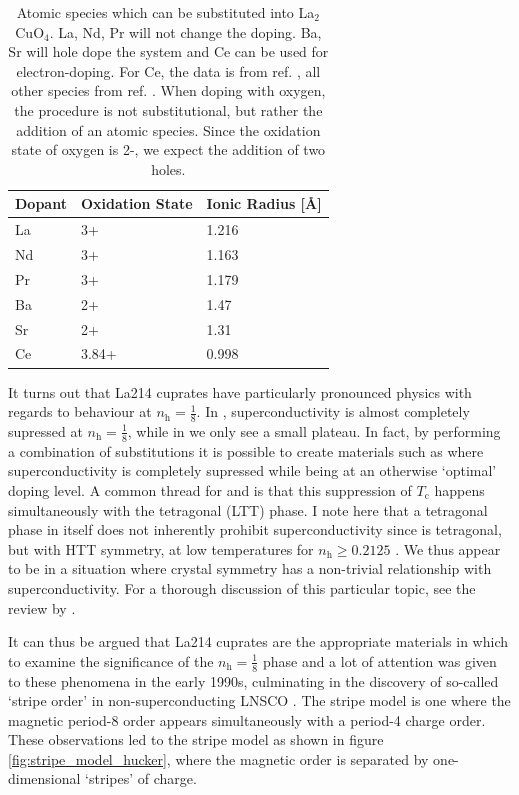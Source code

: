 \begin{table}
    \caption{Atomic species which can be substituted into La$_2$CuO$_4$. La, Nd, Pr will not change the doping. Ba, Sr will hole dope the system and Ce can be used for electron-doping. For Ce, the data is from ref. \cite{Huang1989}, all other species from ref. \cite{Shannon1976}. When doping with oxygen, the procedure is not substitutional, but rather the addition of an atomic species. Since the oxidation state of oxygen is 2-, we expect the addition of two holes.}
    \label{tab:dopants}
    \centering
    \begin{tabular}{lll}
        \toprule
        Dopant & Oxidation State & Ionic Radius [\AA] \\ \midrule
        La     & 3+              & 1.216        \\
        Nd     & 3+              & 1.163        \\
        Pr     & 3+              & 1.179        \\
        Ba     & 2+              & 1.47         \\
        Sr     & 2+              & 1.31         \\
        Ce     & 3.84+           & 0.998        \\ \bottomrule
    \end{tabular}
\end{table}

It turns out that La214 cuprates have particularly pronounced physics with regards to behaviour at $n_\text{h} = \frac{1}{8}$. In \LBCO{}, superconductivity is almost completely supressed at $n_\text{h} = \frac{1}{8}$, while in \LSCO{} we only see a small plateau. In fact, by performing a combination of substitutions it is possible to create materials such as \LNSCO{} where superconductivity is completely supressed while being at an otherwise `optimal' doping level. A common thread for \LBCO{} and \LNSCO{} is that this suppression of $T_\text{c}$ happens simultaneously with the tetragonal (LTT) phase. I note here that a tetragonal phase in itself does not inherently prohibit superconductivity since \LSCO{} is tetragonal, but with HTT symmetry, at low temperatures for $n_\text{h} \geq 0.2125$ \cite{Radaelli1994a}. We thus appear to be in a situation where crystal symmetry has a non-trivial relationship with superconductivity. For a thorough discussion of this particular topic, see the review by \citeauthor{Hucker2012} \cite{Hucker2012}.

It can thus be argued that La214 cuprates are the appropriate materials in which to examine the significance of the $n_\text{h} = \frac{1}{8}$ phase and a lot of attention was given to these phenomena in the early 1990s, culminating in the discovery of so-called `stripe order' in non-superconducting LNSCO \cite{Tranquada1995}. The stripe model is one where the magnetic period-8 order appears simultaneously with a period-4 charge order. These observations led to the stripe model as shown in figure \ref{fig:stripe_model_hucker}, where the magnetic order is separated by one-dimensional `stripes' of charge. 

